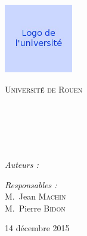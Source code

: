 
\begin{titlepage}

\begin{center}

\begin{flushleft}
  \includegraphics [width=30mm]{images/logo-univ.jpg} \\[0.5cm]
  \begin{spacing}{1.5}
    \textsc{\LARGE Université de Rouen}\\[1.5cm]
  \end{spacing}
\end{flushleft}

\textsc{\Large \reportsubject}\\[0.5cm]
\HRule \\[0.4cm]
{\huge \bfseries \reporttitle}\\[0.4cm]
\HRule \\[1.5cm]

\begin{minipage}[t]{0.3\textwidth}
  \begin{flushleft} \large
    \emph{Auteurs :}\\
    \reportauthor
  \end{flushleft}
\end{minipage}
\begin{minipage}[t]{0.6\textwidth}
  \begin{flushright} \large
    \emph{Responsables :} \\
    M.~Jean \textsc{Machin} \\
    M.~Pierre \textsc{Bidon}
  \end{flushright}
\end{minipage}

\vfill

{\large 14 décembre 2015}

\end{center}

\end{titlepage}
